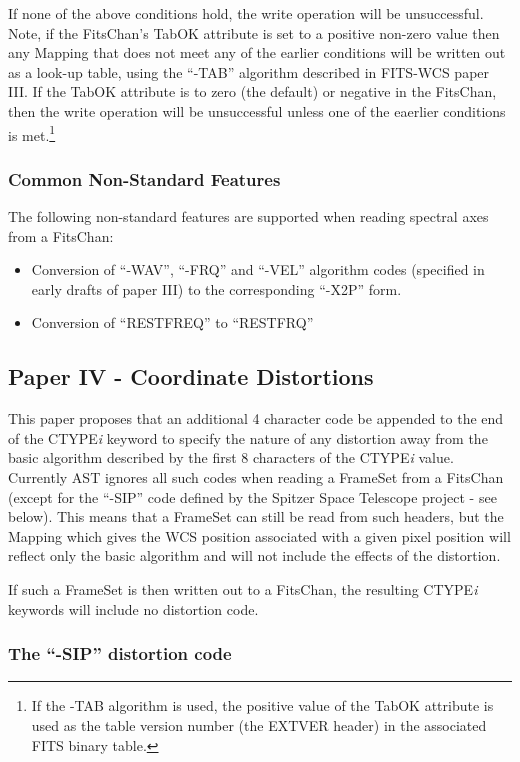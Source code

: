 \documentclass[twoside,11pt]{article}
\begin{document}
If none of the above conditions hold, the write operation will be
unsuccessful. Note, if the FitsChan's TabOK attribute is set to a positive
non-zero value then any Mapping that does not meet any of the earlier conditions
will be written out as a look-up table, using the ``-TAB'' algorithm described
in FITS-WCS paper III. If the TabOK attribute is to zero (the default) or
negative in the FitsChan, then the write operation will be unsuccessful unless
one of the eaerlier conditions is met.\footnote{If the -TAB algorithm is used, the
positive value of the TabOK attribute is used as the table version number
(the EXTVER header) in the associated FITS binary table.}

\subsubsection{Common Non-Standard Features}
The following non-standard features are supported when reading spectral
axes from a FitsChan:

\begin{itemize}
\item Conversion of ``-WAV'', ``-FRQ'' and ``-VEL'' algorithm codes
(specified in early drafts of paper III) to the corresponding
``-X2P'' form.
\item Conversion of ``RESTFREQ'' to ``RESTFRQ''
\end{itemize}

\subsection{Paper IV - Coordinate Distortions}

This paper proposes that an additional 4 character code be appended to
the end of the CTYPE\emph{i} keyword to specify the nature of any
distortion away from the basic algorithm described by the first 8
characters of the CTYPE\emph{i} value. Currently AST ignores all such
codes when reading a FrameSet from a FitsChan (except for the ``-SIP'' code
defined by the Spitzer Space Telescope project - see below). This means that
a FrameSet can still be read from such headers, but the Mapping which gives
the WCS position associated with a given pixel position will reflect only
the basic algorithm and will not include the effects of the distortion.

If such a FrameSet is then written out to a FitsChan, the resulting
CTYPE\emph{i} keywords will include no distortion code.

\subsubsection{The ``-SIP'' distortion code}
\end{document}

